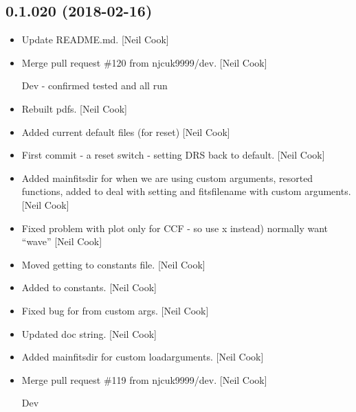 \documentclass[a4paper,10pt,english]{report}
\begin{document}
\subsection{0.1.020 (2018-02-16)}
\label{\detokenize{misc/changelog:id483}}\begin{itemize}
\item {} 
Update README.md. {[}Neil Cook{]}

\item {} 
Merge pull request \#120 from njcuk9999/dev. {[}Neil Cook{]}

Dev - confirmed tested and all run

\item {} 
Rebuilt pdfs. {[}Neil Cook{]}

\item {} 
Added current default files (for reset) {[}Neil Cook{]}

\item {} 
First commit - a reset switch - setting DRS back to default. {[}Neil
Cook{]}

\item {} 
Added mainfitsdir for when we are using custom arguments, resorted
functions, added  to deal with
setting  and fitsfilename with custom arguments. {[}Neil
Cook{]}

\item {} 
Fixed problem with plot  only for CCF - so use x instead)
normally want “wave” {[}Neil Cook{]}

\item {} 
Moved  getting to constants file. {[}Neil Cook{]}

\item {} 
Added  to constants. {[}Neil Cook{]}

\item {} 
Fixed bug for  from custom args. {[}Neil Cook{]}

\item {} 
Updated doc string. {[}Neil Cook{]}

\item {} 
Added mainfitsdir for custom loadarguments. {[}Neil Cook{]}

\item {} 
Merge pull request \#119 from njcuk9999/dev. {[}Neil Cook{]}

Dev


\end{itemize}
\end{document}
